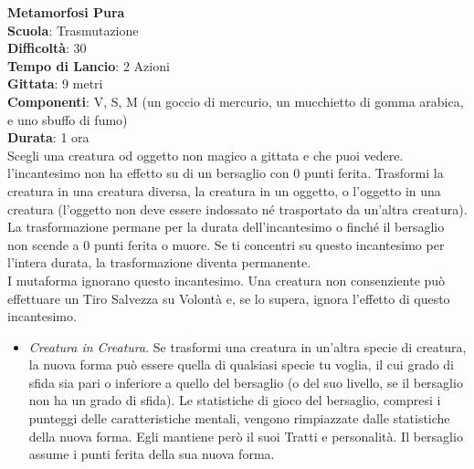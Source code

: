 \begin{multicols}{2}
\medskip\textbf{Metamorfosi Pura}\\
\textbf{Scuola}: Trasmutazione\\
\textbf{Difficoltà}:  30\\
\textbf{Tempo di Lancio}: 2 Azioni\\
\textbf{Gittata}: 9 metri\\
\textbf{Componenti}: V, S, M (un goccio di mercurio, un mucchietto di gomma arabica, e uno sbuffo di fumo) \\
\textbf{Durata}: 1 ora \\
Scegli una creatura od oggetto non magico a gittata e che puoi vedere. l'incantesimo non ha effetto su di un bersaglio con 0 punti ferita. Trasformi la creatura in una creatura diversa, la creatura in un oggetto, o l’oggetto in una creatura (l’oggetto non deve essere indossato né trasportato da un'altra creatura). La trasformazione permane per la durata dell'incantesimo o finché il bersaglio non scende a 0 punti ferita o muore. Se ti concentri su questo incantesimo per l’intera durata, la
trasformazione diventa permanente.\\
I mutaforma ignorano questo incantesimo. Una creatura non consenziente può effettuare un Tiro Salvezza su Volontà e, se lo supera, ignora l’effetto di questo incantesimo.\\
\medskip\begin{itemize}
\item
\textit{Creatura in Creatura}. Se trasformi una creatura in un'altra specie di creatura, la nuova forma può essere quella di qualsiasi specie tu voglia, il cui grado di sfida sia pari o inferiore a quello del bersaglio (o del suo livello, se il bersaglio non ha un grado di sfida). Le statistiche di gioco del bersaglio, compresi i punteggi delle caratteristiche mentali, vengono rimpiazzate dalle statistiche della nuova forma. Egli mantiene però il suoi Tratti e personalità. Il bersaglio assume i punti ferita della sua nuova forma.\\

\end{itemize}
\end{multicols}
